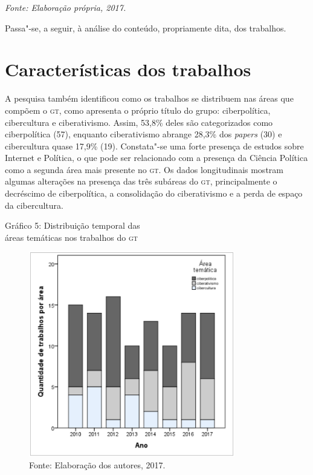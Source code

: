 \begin{center}
{\footnotesize\emph{Fonte: Elaboração própria, 2017.}}
\end{center}

Passa"-se, a seguir, à análise do conteúdo, propriamente dita, dos
trabalhos.

\section{Características dos trabalhos}

A pesquisa também identificou como os trabalhos se distribuem nas áreas
que compõem o \textsc{gt}, como apresenta o próprio título do grupo:
ciberpolítica, cibercultura e ciberativismo. Assim, 53,8\% deles são
categorizados como ciberpolítica (57), enquanto ciberativismo abrange
28,3\% dos \emph{papers} (30) e cibercultura quase 17,9\% (19).
Constata"-se uma forte presença de estudos sobre Internet e Política, o
que pode ser relacionado com a presença da Ciência Política como a
segunda área mais presente no \textsc{gt}. Os dados longitudinais mostram algumas
alterações na presença das três subáreas do \textsc{gt}, principalmente o
decréscimo de ciberpolítica, a consolidação do ciberativismo e a perda
de espaço da cibercultura.

\begin{center}
Gráfico 5: Distribuição temporal das\\ áreas temáticas nos trabalhos do \textsc{gt}
\end{center}

\begin{figure}[!ht]
\centering
 \includegraphics[width=90mm]{./imgs/graf3_5.png}
\caption{Fonte: Elaboração dos autores, 2017.}
\end{figure}

